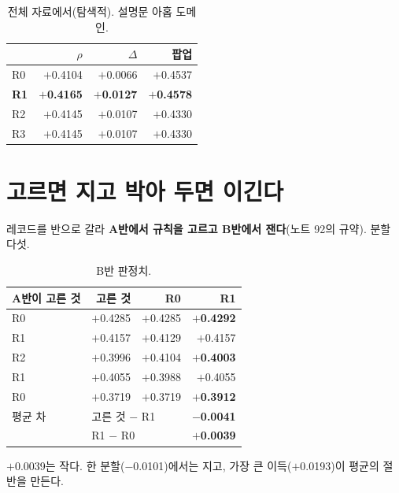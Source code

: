 \documentclass[10pt]{article}
\begin{document}
\begin{table}[t]
\centering\tsize
\caption{전체 자료에서(탐색적). 설명문 아홉 도메인.}
\begin{tabular}{lrrr}
\toprule
& $\rho$ & $\Delta$ & 팝업 \\
\midrule
R0 & $+$0.4104 & $+$0.0066 & $+$0.4537 \\
\textbf{R1} & \textbf{$+$0.4165} & \textbf{$+$0.0127} & \textbf{$+$0.4578} \\
R2 & $+$0.4145 & $+$0.0107 & $+$0.4330 \\
R3 & $+$0.4145 & $+$0.0107 & $+$0.4330 \\
\bottomrule
\end{tabular}
\end{table}

\section{고르면 지고 박아 두면 이긴다}

레코드를 반으로 갈라 \textbf{A반에서 규칙을 고르고 B반에서 잰다}(노트 92의
규약). 분할 다섯.

\begin{table}[t]
\centering\tsize
\caption{B반 판정치.}
\begin{tabular}{lrrr}
\toprule
A반이 고른 것 & 고른 것 & R0 & \textbf{R1} \\
\midrule
R0 & $+$0.4285 & $+$0.4285 & \textbf{$+$0.4292} \\
R1 & $+$0.4157 & $+$0.4129 & $+$0.4157 \\
R2 & $+$0.3996 & $+$0.4104 & \textbf{$+$0.4003} \\
R1 & $+$0.4055 & $+$0.3988 & $+$0.4055 \\
R0 & $+$0.3719 & $+$0.3719 & \textbf{$+$0.3912} \\
\midrule
평균 차 & \multicolumn{2}{l}{고른 것 $-$ R1} & \textbf{$-$0.0041} \\
& \multicolumn{2}{l}{R1 $-$ R0} & \textbf{$+$0.0039} \\
\bottomrule
\end{tabular}
\end{table}

{$+$0.0039는 작다. 한 분할($-$0.0101)에서는 지고, 가장 큰 이득($+$0.0193)이
평균의 절반을 만든다.}
\end{document}
